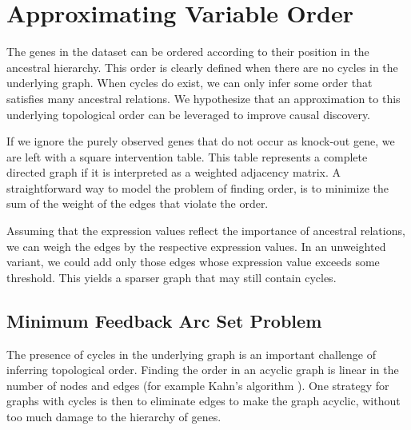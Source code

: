 \newpage
\section{Approximating Variable Order}








The genes in the dataset can be ordered according to their position in the ancestral hierarchy. This order is clearly defined when there are no cycles in the underlying graph. When cycles do exist, we can only infer some order that satisfies many ancestral relations. We hypothesize that an approximation to this underlying topological order can be leveraged to improve causal discovery.

If we ignore the purely observed genes that do not occur as knock-out gene, we are left with a square intervention table. This table represents a complete directed graph if it is interpreted as a weighted adjacency matrix. A straightforward way to model the problem of finding order, is to minimize the sum of the weight of the edges that violate the order. 

Assuming that the expression values reflect the importance of ancestral relations, we can weigh the edges by the respective expression values. In an unweighted variant, we could add only those edges whose expression value exceeds some threshold. This yields a sparser graph that may still contain cycles.

\subsection{Minimum Feedback Arc Set Problem}
The presence of cycles in the underlying graph is an important challenge of inferring topological order. Finding the order in an acyclic graph is linear in the number of nodes and edges (for example Kahn's algorithm ). One strategy for graphs with cycles is then to eliminate edges to make the graph acyclic, without too much damage to the hierarchy of genes.

